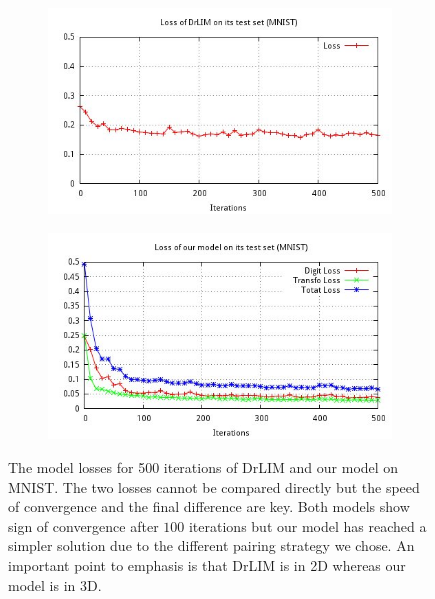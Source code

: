 \documentclass[a4paper,12pt]{report}
\begin{document}
\begin{figure}[h]
    \centering
    \begin{subfigure}{0.45\textwidth}
        \centering
        \includegraphics[width=\textwidth]{thesis_figures/final_loss_testset_2bv7.jpg}
    \end{subfigure}
    \begin{subfigure}{0.45\textwidth}
        \centering
        \includegraphics[width=\textwidth]{thesis_figures/final_loss_testset_3Dc3.jpg}
    \end{subfigure}
    \caption{The model losses for 500 iterations of DrLIM and our model on MNIST.
    The two losses cannot be compared directly but the speed of convergence and the final difference are key.
    Both models show sign of convergence after $100$ iterations but our model has reached a simpler solution due to the different pairing strategy we chose.
    An important point to emphasis is that DrLIM is in 2D whereas our model is in 3D.
    }
    \label{fig:mnist_cl2d_loss}
\end{figure}
\end{document}
